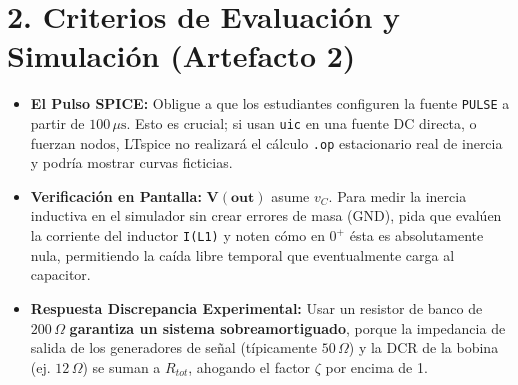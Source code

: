 \documentclass[11pt, a4paper]{article}
\begin{document}
\section*{2. Criterios de Evaluación y Simulación (Artefacto 2)}
\begin{itemize}
    \item \textbf{El Pulso SPICE:} Obligue a que los estudiantes configuren la fuente \texttt{PULSE} a partir de $100\,\mu\text{s}$. Esto es crucial; si usan \texttt{uic} en una fuente DC directa, o fuerzan nodos, LTspice no realizará el cálculo \texttt{.op} estacionario real de inercia y podría mostrar curvas ficticias.
    \item \textbf{Verificación en Pantalla:} $\mathbf{V(out)}$ asume $v_C$. Para medir la inercia inductiva en el simulador sin crear errores de masa (GND), pida que evalúen la corriente del inductor \texttt{I(L1)} y noten cómo en $0^+$ ésta es absolutamente nula, permitiendo la caída libre temporal que eventualmente carga al capacitor.
    \item \textbf{Respuesta Discrepancia Experimental:} Usar un resistor de banco de $200\,\Omega$ \textbf{garantiza un sistema sobreamortiguado}, porque la impedancia de salida de los generadores de señal (típicamente $50\,\Omega$) y la DCR de la bobina (ej. $12\,\Omega$) se suman a $R_{tot}$, ahogando el factor $\zeta$ por encima de 1.
\end{itemize}
\end{document}
